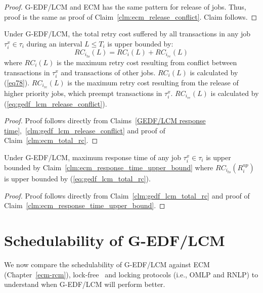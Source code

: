 %
\begin{proof}
%
G-EDF/LCM and ECM has the same pattern for release of jobs. Thus, proof is the same as proof of Claim~\ref{clm:ecm_release_conflict}. Claim follows.
%
\end{proof}
%
\begin{clm}\label{clm:gedf_lcm_total_rc}
Under G-EDF/LCM, the total retry cost suffered by all transactions in any job $\tau_i^x \in \tau_i$ during an interval $L\le T_i$ is upper bounded by:
\begin{equation}
RC_{i_{to}}(L)=RC_i(L)+RC_{i_{re}}(L)
\label{eq:gedf_lcm_total_rc}
\end{equation}
where $RC_i(L)$ is the maximum retry cost resulting from conflict between transactions in $\tau_i^x$ and transactions of other jobs. $RC_i(L)$ is calculated by (\ref{eq78}). $RC_{i_{re}}(L)$ is the maximum retry cost resulting from the release of higher priority jobs, which preempt transactions in $\tau_i^x$. $RC_{i_{re}}(L)$ is calculated by (\ref{eq:gedf_lcm_release_conflict}).
%
\end{clm}
%
\begin{proof}
Proof follows directly from Claims~\ref{GEDF/LCM response time},~\ref{clm:gedf_lcm_release_conflict} and proof of Claim~\ref{clm:ecm_total_rc}.
%
\end{proof}
%
\begin{clm}\label{clm:gedf_lcm_response_time_upper_bound}
%
Under G-EDF/LCM, maximum response time of any job $\tau_i^x \in \tau_i$ is upper bounded by Claim~\ref{clm:ecm_response_time_upper_bound} where $RC_{i_{to}}(R_i^{up})$ is upper bounded by (\ref{eq:gedf_lcm_total_rc}).
%
\end{clm}
%
\begin{proof}
%
Proof follows directly from Claim~\ref{clm:gedf_lcm_total_rc} and proof of Claim~\ref{clm:ecm_response_time_upper_bound}.
%
\end{proof}
%
\section{Schedulability of G-EDF/LCM}\label{performance g-edf-lcm}
%
We now compare the schedulability of G-EDF/LCM against ECM (Chapter~\ref{ecm-rcm}), lock-free~\cite{key-5} and locking protocols (i.e., OMLP\cite{springerlink:10.1007/s10617-012-9090-1,key-3} and RNLP\cite{6257574}) to understand when G-EDF/LCM will perform better. 
%
